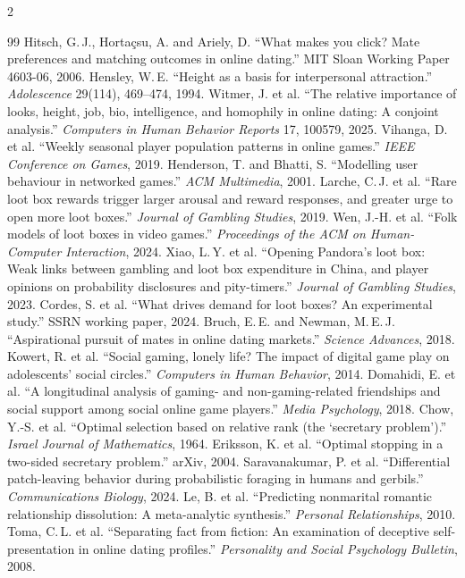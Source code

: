 \documentclass[11pt]{article}
\theoremstyle{definition}
\theoremstyle{plain}
\begin{document}
\begin{multicols}{2}
\begin{thebibliography}{99}
 Hitsch, G.\,J., Horta\c{c}su, A. and Ariely, D. ``What makes you click? Mate preferences and matching outcomes in online dating.'' MIT Sloan Working Paper 4603-06, 2006.
 Hensley, W.\,E. ``Height as a basis for interpersonal attraction.'' \textit{Adolescence} 29(114), 469--474, 1994.
 Witmer, J. et al. ``The relative importance of looks, height, job, bio, intelligence, and homophily in online dating: A conjoint analysis.'' \textit{Computers in Human Behavior Reports} 17, 100579, 2025.
 Vihanga, D. et al. ``Weekly seasonal player population patterns in online games.'' \textit{IEEE Conference on Games}, 2019.
 Henderson, T. and Bhatti, S. ``Modelling user behaviour in networked games.'' \textit{ACM Multimedia}, 2001.
 Larche, C.\,J. et al. ``Rare loot box rewards trigger larger arousal and reward responses, and greater urge to open more loot boxes.'' \textit{Journal of Gambling Studies}, 2019.
 Wen, J.-H. et al. ``Folk models of loot boxes in video games.'' \textit{Proceedings of the ACM on Human-Computer Interaction}, 2024.
 Xiao, L.\,Y. et al. ``Opening Pandora's loot box: Weak links between gambling and loot box expenditure in China, and player opinions on probability disclosures and pity-timers.'' \textit{Journal of Gambling Studies}, 2023.
 Cordes, S. et al. ``What drives demand for loot boxes? An experimental study.'' SSRN working paper, 2024.
 Bruch, E.\,E. and Newman, M.\,E.\,J. ``Aspirational pursuit of mates in online dating markets.'' \textit{Science Advances}, 2018.
 Kowert, R. et al. ``Social gaming, lonely life? The impact of digital game play on adolescents' social circles.'' \textit{Computers in Human Behavior}, 2014.
 Domahidi, E. et al. ``A longitudinal analysis of gaming- and non-gaming-related friendships and social support among social online game players.'' \textit{Media Psychology}, 2018.
 Chow, Y.-S. et al. ``Optimal selection based on relative rank (the `secretary problem').'' \textit{Israel Journal of Mathematics}, 1964.
 Eriksson, K. et al. ``Optimal stopping in a two-sided secretary problem.'' arXiv, 2004.
 Saravanakumar, P. et al. ``Differential patch-leaving behavior during probabilistic foraging in humans and gerbils.'' \textit{Communications Biology}, 2024.
 Le, B. et al. ``Predicting nonmarital romantic relationship dissolution: A meta-analytic synthesis.'' \textit{Personal Relationships}, 2010.
 Toma, C.\,L. et al. ``Separating fact from fiction: An examination of deceptive self-presentation in online dating profiles.'' \textit{Personality and Social Psychology Bulletin}, 2008.
\end{thebibliography}
\end{multicols}
\end{document}
